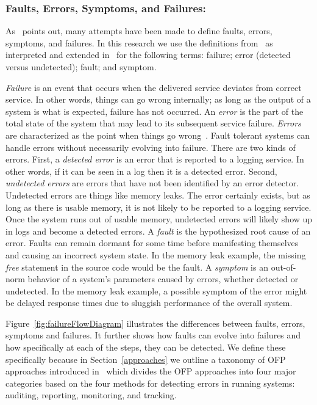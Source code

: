 \subsubsection{Faults, Errors, Symptoms, and Failures:}
As~\cite{salfnerSurvey} points out, many attempts have been made to define faults, errors, symptoms, and failures.  In this research we use the definitions from~\cite{avivzienis2004basic} as interpreted and extended in~\cite{salfnerSurvey} for the following terms: failure; error (detected versus undetected); fault; and symptom.

\emph{Failure} is an event that occurs when the delivered service deviates from correct service.  In other words, things can go wrong internally; as long as the output of a system is what is expected, failure has not occurred.  An \emph{error} is the part of the total state of the system that may lead to its subsequent service failure.  \emph{Errors} are characterized as the point when things go wrong~\cite{salfnerSurvey}.  Fault tolerant systems can handle errors without necessarily evolving into failure.  There are two kinds of errors.  First, a \emph{detected error} is an error that is reported to a logging service.  In other words, if it can be seen in a log then it is a detected error.  Second, \emph{undetected errors} are errors that have not been identified by an error detector.  Undetected errors are things like memory leaks.  The error certainly exists, but as long as there is usable memory, it is not likely to be reported to a logging service.  Once the system runs out of usable memory, undetected errors will likely show up in logs and become a detected errors.  A \emph{fault} is the hypothesized root cause of an error.  Faults can remain dormant for some time before manifesting themselves and causing an incorrect system state.  In the memory leak example, the missing \emph{free} statement in the source code would be the fault.  A \emph{symptom} is an out-of-norm behavior of a system's parameters caused by errors, whether detected or undetected.  In the memory leak example, a possible symptom of the error might be delayed response times due to sluggish performance of the overall system.

\figfailureFlowDiagram

Figure~\ref{fig:failureFlowDiagram} illustrates the differences between faults, errors, symptoms and failures.  It further shows how faults can evolve into failures and how specifically at each of the steps, they can be detected.  We define these specifically because in Section~\ref{approaches} we outline a taxonomy of OFP approaches introduced in~\cite{salfnerSurvey} which divides the OFP approaches into four major categories based on the four methods for detecting errors in running systems: auditing, reporting, monitoring, and tracking.

